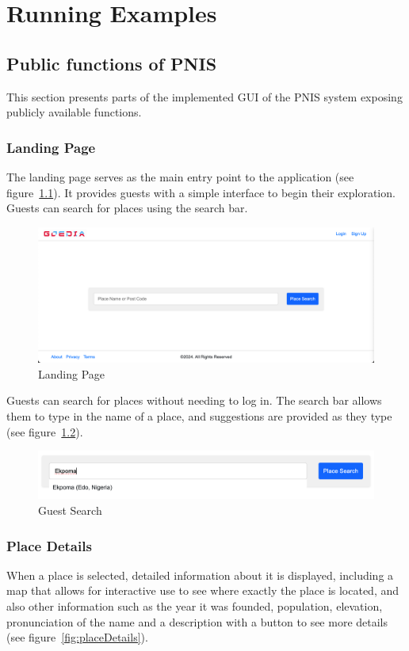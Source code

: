 \chapter{Running Examples}
\section{Public functions of PNIS}
This section presents parts of the implemented GUI of the PNIS system exposing publicly available functions. 
\subsection{Landing Page}
The landing page serves as the main entry point to the application (see figure~\ref{fig:landingPage}). It provides guests with a simple interface to begin their exploration. Guests can search for places using the search bar.
\begin{figure}[htb]
    \centering
    \includegraphics[width=\textwidth]{landingPage.png}
    \caption{Landing Page}
    \label{fig:landingPage}
\end{figure}

Guests can search for places without needing to log in. The search bar allows them to type in the name of a place, and suggestions are provided as they type (see figure~\ref{fig:guestSearch}).
\begin{figure}[htb]
    \centering
    \includegraphics[width=.6\textwidth]{guestSearch.png}
    \caption{Guest Search}
    \label{fig:guestSearch}
\end{figure}

\subsection{Place Details}
When a place is selected, detailed information about it is displayed, including a map that allows for interactive use to see where exactly the place is located, and also other information such as the year it was founded, population, elevation, pronunciation of the name and a description with a button to see more details (see figure~\ref{fig:placeDetails}).

